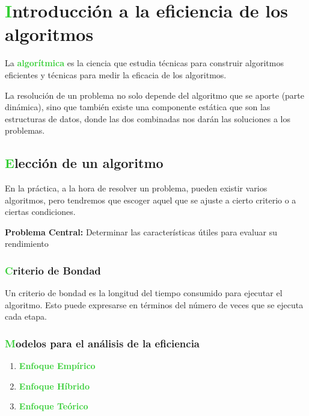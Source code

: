 \documentclass[10pt,a4paper,spanish]{report}
\theoremstyle{definition}
\theoremstyle{remark}
\begin{document}
    \section{\textcolor{LimeGreen}Introducción a la eficiencia de los algoritmos}
    
    La \textbf{\textcolor{LimeGreen}{algorítmica}} es la ciencia que estudia técnicas para construir algoritmos eficientes y técnicas para medir la eficacia de los algoritmos.

    La resolución de un problema no solo depende del algoritmo que se aporte (parte dinámica), sino que también existe una componente estática que son las estructuras de datos, donde las dos combinadas nos darán las soluciones a los problemas.

    \subsection{\textcolor{LimeGreen}Elección de un algoritmo}
    
    En la práctica, a la hora de resolver un problema, pueden existir varios algoritmos, pero tendremos que escoger aquel que se ajuste a cierto criterio o a ciertas condiciones.

    \begin{center}
        {\large{\textbf{Problema Central:} Determinar las características útiles para evaluar su rendimiento}}
    \end{center}

    \subsubsection{\textcolor{LimeGreen}Criterio de Bondad}
    
    Un criterio de bondad es la longitud del tiempo consumido para ejecutar el algoritmo. Esto puede expresarse en términos del número de veces que se ejecuta cada etapa.

    \subsubsection{\textcolor{LimeGreen}Modelos para el análisis de la eficiencia}

    \begin{enumerate}[$ \clubsuit $]
        \item \textbf{\textcolor{LimeGreen}{Enfoque Empírico}}
        \item \textbf{\textcolor{LimeGreen}{Enfoque Híbrido}}
        \item \textbf{\textcolor{LimeGreen}{Enfoque Teórico}}
    \end{enumerate}
\end{document}
